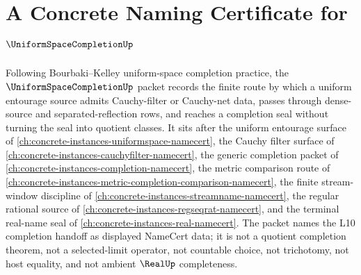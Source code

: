 \chapter{A Concrete Naming Certificate for $\UniformSpaceCompletionUp$}
\label{ch:concrete-instances-uniform-space-completion-namecert}

Following Bourbaki--Kelley uniform-space completion practice, the $\UniformSpaceCompletionUp$ packet records the finite route by which a uniform entourage source admits Cauchy-filter or Cauchy-net data, passes through dense-source and separated-reflection rows, and reaches a completion seal without turning the seal into quotient classes. It sits after the uniform entourage surface of \autoref{ch:concrete-instances-uniformspace-namecert}, the Cauchy filter surface of \autoref{ch:concrete-instances-cauchyfilter-namecert}, the generic completion packet of \autoref{ch:concrete-instances-completion-namecert}, the metric comparison route of \autoref{ch:concrete-instances-metric-completion-comparison-namecert}, the finite stream-window discipline of \autoref{ch:concrete-instances-streamname-namecert}, the regular rational source of \autoref{ch:concrete-instances-regseqrat-namecert}, and the terminal real-name seal of \autoref{ch:concrete-instances-real-namecert}. The packet names the L10 completion handoff as displayed NameCert data; it is not a quotient completion theorem, not a selected-limit operator, not countable choice, not trichotomy, not host equality, and not ambient $\RealUp$ completeness.

